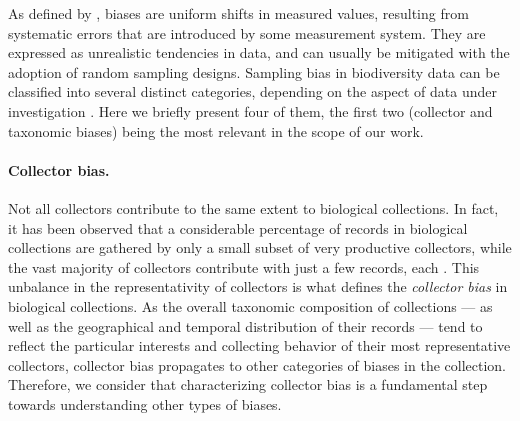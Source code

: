 As defined by , biases are uniform shifts in measured values, resulting from systematic errors that are introduced by some measurement system.
They are expressed as unrealistic tendencies in data, and can usually be mitigated with the adoption of random sampling designs.
%
Sampling bias in biodiversity data can be classified into several distinct categories, depending on the aspect of data under investigation \cite{Daru2017}.
Here we briefly present four of them, the first two (collector and taxonomic biases) being the most relevant in the scope of our work.
%
\paragraph*{Collector bias.}
Not all collectors contribute to the same extent to biological collections.
In fact, it has been observed that a considerable percentage of records in biological collections are gathered by only a small subset of very productive collectors, while the vast majority of collectors contribute with just a few records, each \cite{Daru2017,Carine2012}.
This unbalance in the representativity of collectors is what defines the \textit{collector bias} in biological collections.
As the overall taxonomic composition of collections --- as well as the geographical and temporal distribution of their records --- tend to reflect the particular interests and collecting behavior of their most representative collectors, collector bias propagates to other categories of biases in the collection. Therefore, we consider that characterizing collector bias is a fundamental step towards understanding other types of biases.

